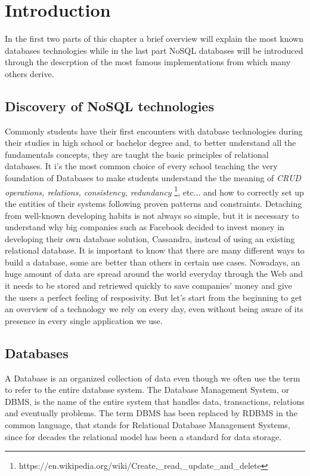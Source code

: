 \chapter{Introduction}
\label{cha:intro}

In the first two parts of this chapter a brief overview will explain the most known databases technologies while in the last part NoSQL databases will be introduced through the descrption of the most famous implementations from which many others derive.


\section{Discovery of NoSQL technologies}
\label{sec:context}

Commonly students have their first encounters with database technologies during their studies in high school or bachelor degree and, to better understand all the fundamentals concepts, they are taught the basic principles of relational databases.
It i’s the most common choice of every school teaching the very foundation of Databases to make students understand the the meaning of \textit{CRUD operations, relations, consistency, redundancy} \footnote{https://en.wikipedia.org/wiki/Create,\_read,\_update\_and\_delete}, etc... and how to correctly set up the entities of their systems following proven patterns and constraints.
Detaching from well-known developing habits is not always so simple, but it is necessary to understand why big companies such as Facebook decided to invest money in developing their own database solution, Cassandra, instead of using an existing relational database.
It is important to know that there are many different ways to build a database, some are better than others in certain use cases. Nowadays, an huge amount of data are spread around the world everyday through the Web and it needs to be stored and retriewed quickly to save companies' money and give the users a perfect feeling of resposivity\cite{ictbusiness}.
But let’s start from the beginning to get an overview of a technology we rely on every day, even without being aware of its presence in every single application we use.


\section{Databases}
\label{sec:problem}

A Database is an organized collection of data even though we often use the term to refer to the entire database system. The Database Management System, or DBMS, is the name of the entire system that handles data, transactions, relations and eventually problems.
The term DBMS has been replaced by RDBMS in the common language, that stands for Relational Database Management Systems, since for decades the relational model has been a standard for data storage.


